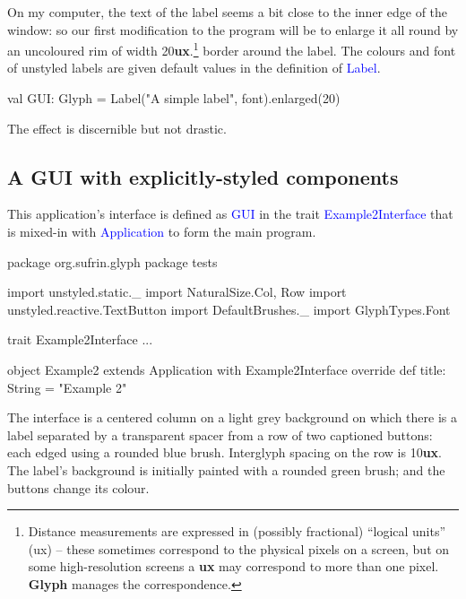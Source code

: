 \documentclass[12pt,a4paper]{article}
\def\ux{\textbf{ux}\xspace}
\def\Scala#1{\textcolor{blue}{\textsf{#1}}}
\def\SS#1{\subsection{#1}}
\begin{document}
On my computer, the text of the label seems a bit close to the
inner edge of the window: so our first modification to the
program will be to enlarge it all round by an uncoloured
rim of width 20\ux.\footnote{Distance measurements are
expressed in (possibly fractional) ``logical units'' (ux) -- these sometimes correspond
to the physical pixels on a screen, but on some high-resolution
screens a \textbf{ux} may correspond to more than one
pixel. \textbf{Glyph} manages the correspondence.} border around the label.
The colours and font of unstyled labels are given default values in
the definition of \Scala{Label}.

\begin{scala}

val GUI: Glyph = Label("A simple label", font).enlarged(20)
\end{scala}

\pagebreak[4]
The effect is discernible but not drastic.
\begin{center}
\quad
{}
\end{center}

\SS{A GUI with explicitly-styled components}

This application's interface is defined as \Scala{GUI} 
in the trait \Scala{Example2Interface} that is mixed-in with
\Scala{Application} to form the main program.

\begin{scala}
package org.sufrin.glyph
package tests

import unstyled.static._
import NaturalSize.{Col, Row}
import unstyled.reactive.TextButton
import DefaultBrushes._
import GlyphTypes.Font
\end{scala}

\begin{scala}
trait Example2Interface { ... }

object Example2 extends Application  with Example2Interface {
  override def title: String = "Example 2"
}
\end{scala}

\begin{center}
\end{center}

The interface is a centered column on a light grey background on
which there is a label separated by a transparent spacer
from a row of two captioned buttons: each edged using a
rounded blue brush. Interglyph spacing on the row is
10\ux.  The label's background is initially painted with
a rounded green brush; and the buttons
change its colour.
\end{document}
